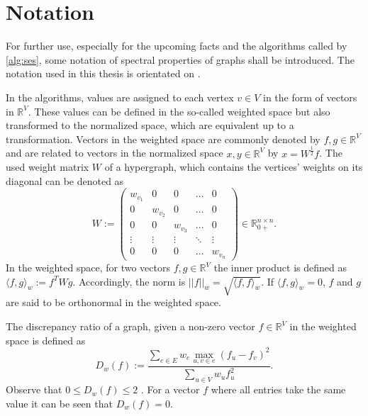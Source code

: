 \chapter{Notation}\label{chapter:notation}
For further use, especially for the upcoming facts and the algorithms called by \cref{alg:ses}, some notation of spectral properties of graphs shall be introduced.
The notation used in this thesis is orientated on \cite{ChanLTZ16}.

In the algorithms, values are assigned to each vertex $v\in V$ in the form of vectors in $\mathbb{R}^V$. These values can be defined in the so-called weighted space but also transformed to the normalized space, which are equivalent up to a transformation. Vectors in the weighted space are commonly denoted by $f,g\in \mathbb{R}^V$ and are related to vectors in the normalized space $x,y \in \mathbb{R}^V$ by $x = W^\frac{1}{2}f$. The used weight matrix $W$ of a hypergraph, which contains the vertices' weights on its diagonal can be denoted as \begin{equation}
W := 
\begin{pmatrix}
w_{v_1} & 0 & 0&\dots &0 \\
0 & w_{v_2} & 0 & \ldots & 0 \\
0 & 0 & w_{v_3} & \ldots & 0 \\
\vdots & \vdots & \vdots & \ddots & \vdots \\
0 &0&0& \ldots  & w_{v_n}
\end{pmatrix} \in \mathbb{R}_{0+}^{n \times n} .
\end{equation} 
In the weighted space, for two vectors $f, g \in \mathbb{R}^V$ the inner product is defined as $ \langle f,g \rangle_w := f^T W g$. Accordingly, the norm is $||f||_w = \sqrt{ \langle f,f \rangle_w}$.
If $ \langle f,g \rangle_w   = 0 $, $f$ and $g$ are said to be orthonormal in the weighted space. 

The discrepancy ratio of a graph, given a non-zero vector $f \in \mathbb{R}^V$ in the weighted space is defined as \begin{equation}\label{eq:discrepancy_ratio}
D_w(f) := \frac{\sum_{e\in E} w_e \max_{u,v\in e}(f_u - f_v)^2}{\sum_{u\in V} w_u f_u^2}.
\end{equation} 
Observe that $0\le D_w(f) \le 2 $ \cite{ChanLTZ16}. For a vector $f$ where all entries take the same value it can be seen that $D_w(f) =0$.
 
